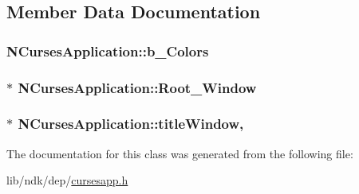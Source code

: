 \subsection{Member Data Documentation}
\hypertarget{class_n_curses_application_a2e435866a06c43c110e0a435e641c16d}{
\subsubsection[{b\-\_\-\-Colors}]{ N\-Curses\-Application\-::b\-\_\-\-Colors\hspace{0.3cm}{\ttfamily [protected]}}}\label{class_n_curses_application_a2e435866a06c43c110e0a435e641c16d}
\hypertarget{class_n_curses_application_acb60c51b333d257562a32e4bef64a0ba}{
\subsubsection[{Root\-\_\-\-Window}]{$\ast$ N\-Curses\-Application\-::\-Root\-\_\-\-Window\hspace{0.3cm}{\ttfamily [protected]}}}\label{class_n_curses_application_acb60c51b333d257562a32e4bef64a0ba}
\hypertarget{class_n_curses_application_a31976ca99082718dcbb567edad6625b0}{
\subsubsection[{title\-Window}]{$\ast$ N\-Curses\-Application\-::title\-Window\hspace{0.3cm}{\ttfamily [static]}, {\ttfamily [protected]}}}\label{class_n_curses_application_a31976ca99082718dcbb567edad6625b0}


The documentation for this class was generated from the following file\-:\begin{DoxyCompactItemize}
\item 
lib/ndk/dep/\hyperlink{cursesapp_8h}{cursesapp.\-h}\end{DoxyCompactItemize}

